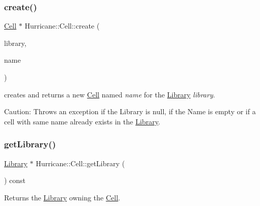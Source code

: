 \subsubsection{\texorpdfstring{create()}{create()}}
{\footnotesize\ttfamily \mbox{\hyperlink{classHurricane_1_1Cell}{Cell}} $\ast$ Hurricane\+::\+Cell\+::create (\begin{DoxyParamCaption}\item[{\mbox{\hyperlink{classHurricane_1_1Library}{Library}} $\ast$}]{library,  }\item[{const \mbox{\hyperlink{classHurricane_1_1Name}{Name}} \&}]{name }\end{DoxyParamCaption})\hspace{0.3cm}{\ttfamily [static]}}

creates and returns a new \mbox{\hyperlink{classHurricane_1_1Cell}{Cell}} named {\itshape name} for the \mbox{\hyperlink{classHurricane_1_1Library}{Library}} {\itshape library}.

\begin{DoxyParagraph}{Caution\+: Throws an exception if the Library is null, if the Name is}
empty or if a cell with same name already exists in the \mbox{\hyperlink{classHurricane_1_1Library}{Library}}. 
\end{DoxyParagraph}
\mbox{\label{classHurricane_1_1Cell_aa84b97773160a28d3dd69df1e261eecf}} 
\subsubsection{\texorpdfstring{get\+Library()}{getLibrary()}}
{\footnotesize\ttfamily \mbox{\hyperlink{classHurricane_1_1Library}{Library}} $\ast$ Hurricane\+::\+Cell\+::get\+Library (\begin{DoxyParamCaption}{ }\end{DoxyParamCaption}) const\hspace{0.3cm}{\ttfamily [inline]}}

Returns the \mbox{\hyperlink{classHurricane_1_1Library}{Library}} owning the \mbox{\hyperlink{classHurricane_1_1Cell}{Cell}}. \mbox{\label{classHurricane_1_1Cell_a01cd4bba972d484496fd297648b8fa0c}} 
